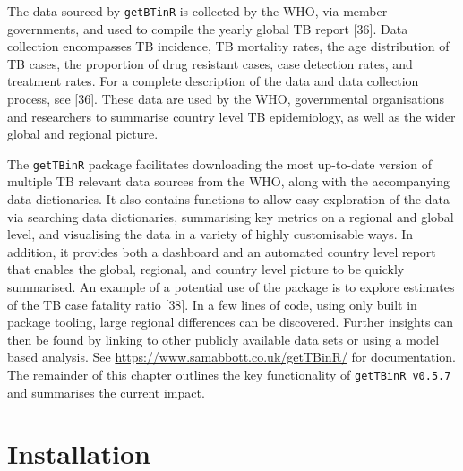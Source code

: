 \documentclass[11pt,twoside]{bristolthesis}
\begin{document}
  The data sourced by \texttt{getBTinR} is collected by the WHO, via member governments, and used to compile the yearly global TB report {[}36{]}. Data collection encompasses TB incidence, TB mortality rates, the age distribution of TB cases, the proportion of drug resistant cases, case detection rates, and treatment rates. For a complete description of the data and data collection process, see {[}36{]}. These data are used by the WHO, governmental organisations and researchers to summarise country level TB epidemiology, as well as the wider global and regional picture.
  
  The \texttt{getTBinR} package facilitates downloading the most up-to-date version of multiple TB relevant data sources from the WHO, along with the accompanying data dictionaries. It also contains functions to allow easy exploration of the data via searching data dictionaries, summarising key metrics on a regional and global level, and visualising the data in a variety of highly customisable ways. In addition, it provides both a dashboard and an automated country level report that enables the global, regional, and country level picture to be quickly summarised. An example of a potential use of the package is to explore estimates of the TB case fatality ratio {[}38{]}. In a few lines of code, using only built in package tooling, large regional differences can be discovered. Further insights can then be found by linking to other publicly available data sets or using a model based analysis. See \url{https://www.samabbott.co.uk/getTBinR/} for documentation. The remainder of this chapter outlines the key functionality of \texttt{getTBinR\ v0.5.7} and summarises the current impact.
  
  \hypertarget{installation}{%
  \section{Installation}\label{installation}}
  
\end{document}
